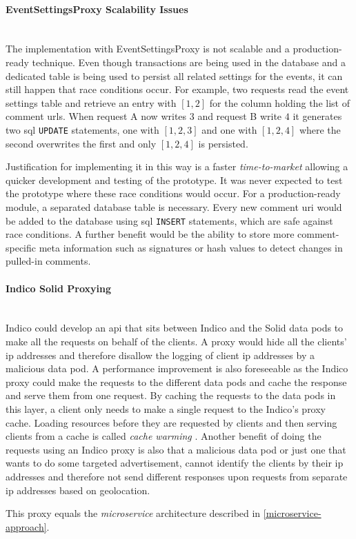 \paragraph{EventSettingsProxy Scalability Issues}\mbox{}\\

The implementation with EventSettingsProxy is not scalable and a production-ready technique. Even though transactions are being used in the database and a dedicated table is being used to persist all related settings for the events, it can still happen that race conditions occur. For example, two requests read the event settings table and retrieve an entry with $[1,2]$ for the column holding the list of comment \glspl{url}. When request A now writes $3$ and request B write $4$ it generates two \gls{sql} \texttt{UPDATE} statements, one with $[1,2,3]$ and one with $[1,2,4]$ where the second overwrites the first and only $[1,2,4]$ is persisted.

Justification for implementing it in this way is a faster \textit{time-to-market} allowing a quicker development and testing of the prototype. It was never expected to test the prototype where these race conditions would occur. For a production-ready module, a separated database table is necessary. Every new comment \gls{uri} would be added to the database using \gls{sql} \texttt{INSERT} statements, which are safe against race conditions. A further benefit would be the ability to store more comment-specific meta information such as signatures or hash values to detect changes in pulled-in comments.
\vspace{0.5cm}
\paragraph{Indico Solid Proxying}\mbox{}\\

Indico could develop an \gls{api} that sits between Indico and the Solid data pods to make all the requests on behalf of the clients. A proxy would hide all the clients' \gls{ip} addresses and therefore disallow the logging of client \gls{ip} addresses by a malicious data pod. A performance improvement is also foreseeable as the Indico proxy could make the requests to the different data pods and cache the response and serve them from one request. By caching the requests to the data pods in this layer, a client only needs to make a single request to the Indico's proxy cache. Loading resources before they are requested by clients and then serving clients from a cache is called \textit{cache warming} \cite{cache-warming}. Another benefit of doing the requests using an Indico proxy is also that a malicious data pod or just one that wants to do some targeted advertisement, cannot identify the clients by their \gls{ip} addresses and therefore not send different responses upon requests from separate \gls{ip} addresses based on geolocation.

This proxy equals the \textit{microservice} architecture described in \ref{microservice-approach}.